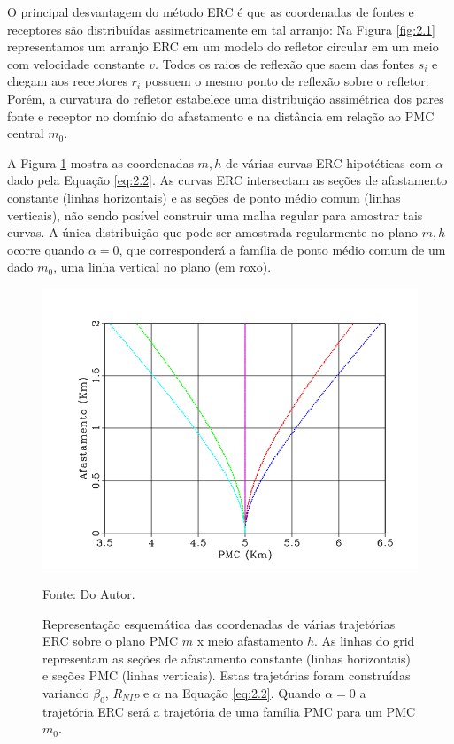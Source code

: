 O principal desvantagem do método ERC é que as coordenadas de fontes e receptores são distribuídas assimetricamente em tal 
arranjo: Na Figura \ref{fig:2.1} representamos um arranjo ERC em um modelo do refletor circular 
em um meio com velocidade constante $v$.
Todos os raios de reflexão que saem das fontes $s_i$ e chegam aos receptores $r_i$ 
possuem o mesmo ponto de reflexão sobre o refletor.
Porém, a curvatura do refletor estabelece uma distribuição assimétrica dos pares fonte e receptor no domínio do afastamento
e na distância em relação ao PMC central $m_0$.

A Figura \ref{fig:2.2} mostra as coordenadas $m,h$ de várias curvas ERC hipotéticas com $\alpha$ dado pela Equação \ref{eq:2.2}.
As curvas ERC intersectam as seções de afastamento constante (linhas horizontais) e as seções de ponto médio comum 
(linhas verticais), não sendo posível construir uma malha regular para amostrar tais curvas.
A única distribuição que pode ser amostrada regularmente no plano $m,h$ ocorre quando $\alpha=0$, que corresponderá
a família de ponto médio comum de um dado $m_0$, uma linha vertical no plano (em roxo).

\begin{figure}[htb]
\caption{Representação esquemática das coordenadas de várias trajetórias ERC sobre o plano PMC $m$ x meio afastamento
$h$. As linhas do grid representam as seções de afastamento constante (linhas horizontais) e seções PMC (linhas verticais).
Estas trajetórias foram construídas variando $\beta_0$, $R_{NIP}$ e $\alpha$  na Equação \ref{eq:2.2}. Quando
$\alpha=0$ a trajetória ERC será a trajetória de uma família PMC para um PMC $m_0$.}
\begin{center}
\includegraphics[scale=0.5]{images/creCoord.png}
\vspace{-0.3cm}
\end{center}
\begin{center}
 Fonte: Do Autor.
\end{center}
\label{fig:2.2}
\end{figure}


